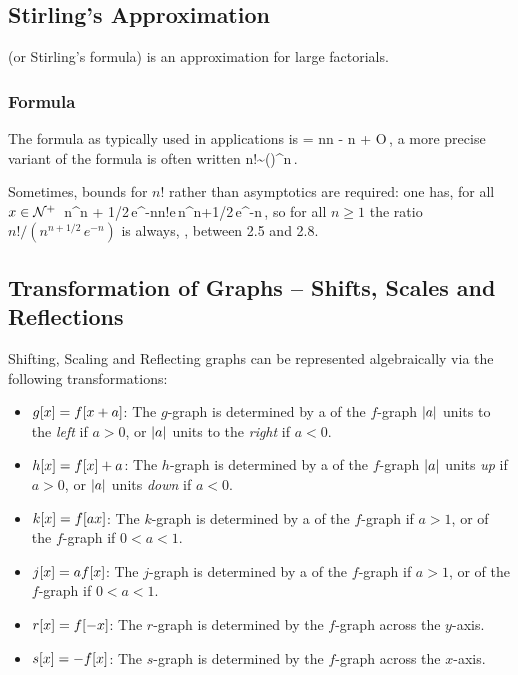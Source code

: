 \subsection{Stirling's Approximation}
 (or Stirling's formula) is an approximation for large factorials. 

\subsubsection{Formula}
The formula as typically used in applications is
\beq
\ln{} = n\ln\vat n - n + O\,,
\eeq
a more precise variant of the formula is often written
\beq
n!\sim {}\left(\right)^n\,. 
\eeq

Sometimes, bounds for $n$! rather than asymptotics are required: one has, for all $x\in\mathcal{N}^+$
\beq
\sqrt{2\pi}\,n^{n + 1/2}\,e^{-n}\leq n!\leq e\,n^{n+1/2}\,e^{-n}\,,
\eeq
so for all $n \geq 1$ the ratio $n!/(n^{n+1/2}\,e^{-n})$ is always, \eg, between 2.5 and 2.8.


\subsection{Transformation of Graphs -- Shifts, Scales and Reflections}
Shifting, Scaling and Reflecting graphs can be represented algebraically via the following transformations:
\begin{itemize}
%
\item $g\!\left[{x}\right] = f\!\left[{x + a}\right]$: The $g$-graph is determined by a  of the $f$-graph $\lvert{a}\rvert$ units to the \emph{left} if $a > 0$, or $\lvert{a}\rvert$ units to the \emph{right} if $a < 0$.
%
\item $h\!\left[{x}\right] = f\!\left[{x}\right] + a$: The $h$-graph is determined by a  of the $f$-graph $\lvert{a}\rvert$ units \emph{up} if $a > 0$, or $\lvert{a}\rvert$ units \emph{down} if $a < 0$.
%
\item $k\!\left[{x}\right] = f\!\left[{ax}\right]$: The $k$-graph is determined by a  of the $f$-graph if $a > 1$, or  of the $f$-graph if $0 < a < 1$.
%
\item $j\!\left[{x}\right] = af\!\left[{x}\right]$: The $j$-graph is determined by a  of the $f$-graph if $a > 1$, or  of the $f$-graph if $0 < a < 1$.
%
\item $r\!\left[{x}\right] = f\!\left[{-x}\right]$: The $r$-graph is determined by  the $f$-graph across the $y$-axis.
%
\item $s\!\left[{x}\right] = -f\!\left[{x}\right]$: The $s$-graph is determined by  the $f$-graph across the $x$-axis.
\end{itemize}

